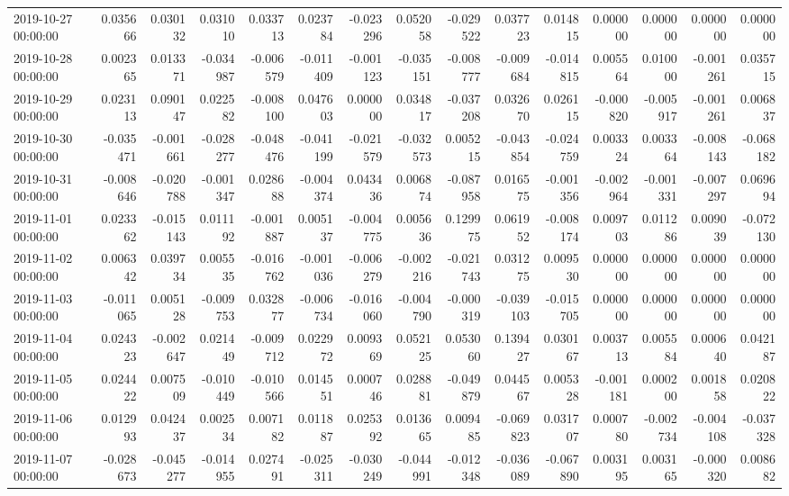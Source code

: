 \begin{tabular}{lrrrrrrrrrrrrrr}
2019-10-27 00:00:00 & 0.035666 & 0.030132 & 0.031010 & 0.033713 & 0.023784 & -0.023296 & 0.052058 & -0.029522 & 0.037723 & 0.014815 & 0.000000 & 0.000000 & 0.000000 & 0.000000 \\
2019-10-28 00:00:00 & 0.002365 & 0.013371 & -0.034987 & -0.006579 & -0.011409 & -0.001123 & -0.035151 & -0.008777 & -0.009684 & -0.014815 & 0.005564 & 0.010000 & -0.001261 & 0.035715 \\
2019-10-29 00:00:00 & 0.023113 & 0.090147 & 0.022582 & -0.008100 & 0.047603 & 0.000000 & 0.034817 & -0.037208 & 0.032670 & 0.026115 & -0.000820 & -0.005917 & -0.001261 & 0.006837 \\
2019-10-30 00:00:00 & -0.035471 & -0.001661 & -0.028277 & -0.048476 & -0.041199 & -0.021579 & -0.032573 & 0.005215 & -0.043854 & -0.024759 & 0.003324 & 0.003364 & -0.008143 & -0.068182 \\
2019-10-31 00:00:00 & -0.008646 & -0.020788 & -0.001347 & 0.028688 & -0.004374 & 0.043436 & 0.006874 & -0.087958 & 0.016575 & -0.001356 & -0.002964 & -0.001331 & -0.007297 & 0.069694 \\
2019-11-01 00:00:00 & 0.023362 & -0.015143 & 0.011192 & -0.001887 & 0.005137 & -0.004775 & 0.005636 & 0.129975 & 0.061952 & -0.008174 & 0.009703 & 0.011286 & 0.009039 & -0.072130 \\
2019-11-02 00:00:00 & 0.006342 & 0.039734 & 0.005535 & -0.016762 & -0.001036 & -0.006279 & -0.002216 & -0.021743 & 0.031275 & 0.009530 & 0.000000 & 0.000000 & 0.000000 & 0.000000 \\
2019-11-03 00:00:00 & -0.011065 & 0.005128 & -0.009753 & 0.032877 & -0.006734 & -0.016060 & -0.004790 & -0.000319 & -0.039103 & -0.015705 & 0.000000 & 0.000000 & 0.000000 & 0.000000 \\
2019-11-04 00:00:00 & 0.024323 & -0.002647 & 0.021449 & -0.009712 & 0.022972 & 0.009369 & 0.052125 & 0.053060 & 0.139427 & 0.030167 & 0.003713 & 0.005584 & 0.000640 & 0.042187 \\
2019-11-05 00:00:00 & 0.024422 & 0.007509 & -0.010449 & -0.010566 & 0.014551 & 0.000746 & 0.028881 & -0.049879 & 0.044567 & 0.005328 & -0.001181 & 0.000200 & 0.001858 & 0.020822 \\
2019-11-06 00:00:00 & 0.012993 & 0.042437 & 0.002534 & 0.007182 & 0.011887 & 0.025392 & 0.013665 & 0.009485 & -0.069823 & 0.031707 & 0.000780 & -0.002734 & -0.004108 & -0.037328 \\
2019-11-07 00:00:00 & -0.028673 & -0.045277 & -0.014955 & 0.027491 & -0.025311 & -0.030249 & -0.044991 & -0.012348 & -0.036089 & -0.067890 & 0.003195 & 0.003165 & -0.000320 & 0.008682 \\

\end{tabular}
